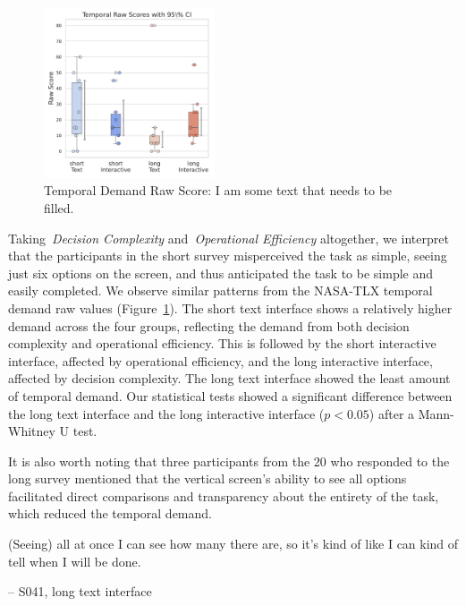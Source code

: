 \begin{figure} %
    \centering
    \includegraphics[width=0.45\textwidth, trim=0 13 0 13, clip]{content/image/cog/Temporal_scores.pdf}
    \captionsetup{width=0.40\textwidth, justification=justified} %
    \caption{Temporal Demand Raw Score: I am some text that needs to be filled.}
    \label{fig:temporal_cog_score}
\end{figure}

Taking~\textit{Decision Complexity} and~\textit{Operational Efficiency} altogether, we interpret that the participants in the short survey misperceived the task as simple, seeing just six options on the screen, and thus anticipated the task to be simple and easily completed. We observe similar patterns from the NASA-TLX temporal demand raw values (Figure~\ref{fig:temporal_cog_score}). The short text interface shows a relatively higher demand across the four groups, reflecting the demand from both decision complexity and operational efficiency. This is followed by the short interactive interface, affected by operational efficiency, and the long interactive interface, affected by decision complexity. The long text interface showed the least amount of temporal demand. Our statistical tests showed a significant difference between the long text interface and the long interactive interface ($p<0.05$) after a Mann-Whitney U test.

It is also worth noting that three participants from the 20 who responded to the long survey mentioned that the vertical screen's ability to see all options facilitated direct comparisons and transparency about the entirety of the task, which reduced the temporal demand.

\begin{displayquote}
(Seeing) all at once I can see how many there are, so it's kind of like I can kind of tell when I will be done.

\noindent \hfill -- S041, long text interface
\end{displayquote}

